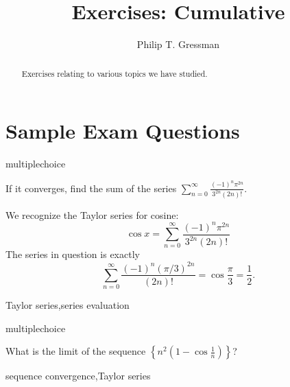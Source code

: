 \documentclass{ximera}
\title{Exercises: Cumulative}
\author{Philip T. Gressman}
\begin{document}
\begin{abstract}
Exercises relating to various topics we have studied.
\end{abstract}
\maketitle

\section*{Sample Exam Questions}

\begin{question}[2015C.02]
\begin{type}
multiplechoice
\end{type}
If it converges, find the sum of the series \(\displaystyle \sum_{n=0}^\infty \frac{(-1)^n \pi^{2n}}{3^{2n} (2n)!}\). 
\begin{multiplechoice}
\end{multiplechoice}
\begin{feedback}
We recognize the Taylor series for cosine:
\[ \cos x = \sum_{n=0}^\infty \frac{(-1)^n \pi^{2n}}{3^{2n}(2n)!} \]
The series in question is exactly
\[ \sum_{n=0}^\infty \frac{(-1)^n (\pi/3)^{2n}}{(2n)!} = \cos \frac{\pi}{3} = \frac{1}{2}. \]
\end{feedback}
\begin{keywords}
Taylor series,series evaluation
\end{keywords}
\end{question}

\begin{question}[2015C.05]
\begin{type}
multiplechoice
\end{type}
What is the limit of the sequence \(\displaystyle \left\{ n^2 \left( 1 - \cos \frac{1}{n} \right) \right\}\)?
\begin{multiplechoice}
\end{multiplechoice}
\begin{keywords}
sequence convergence,Taylor series
\end{keywords}
\end{question}
\end{document}
